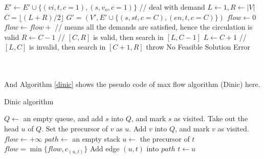 \documentclass{article}
\begin{document}
\begin{enumerate}
\begin{minipage}[H]{0.9\textwidth}
\begin{algorithm}[H]
\begin{algorithmic}[1]
            \State $E' \leftarrow E'\cup \{(vi, t, c=1), (s, v_o, c=1)\}$ // deal with demand
        \EndFor
        \State $L\leftarrow 1, R\leftarrow |V|$
            \State $C = \lfloor(L + R) / 2\rfloor$
            \State $G' = (V', E'\cup\{(s, st, c=C), (en, t, c=C)\})$
            \State$flow\leftarrow 0$
                \State $flow \leftarrow flow +$
            \EndWhile
             // means all the demands are satisfied, hence the circulation is valid
                \State $R\leftarrow C-1$ // $[C, R]$ is valid, then search in $[L, C-1]$
            \Else 
                \State $L\leftarrow C+1$ // $[L, C]$ is invalid, then search in $[C+1, R]$
            \EndIf
        \EndWhile
            \State {}
        \Else
            \State throw No Feasible Solution Error
        \EndIf
    \EndFunction
\end{algorithmic}
\end{algorithm}
\end{minipage}\\~\\
And Algorithm \ref{dinic} shows the pseudo code of max flow algorithm (Dinic) here.\\
\begin{minipage}[htb]{0.9\textwidth}
\begin{algorithm}[H]
\caption{Dinic algorithm}
\label{dinic}
\begin{algorithmic}[1]
    \State $Q\leftarrow$ an empty queue, and add $s$ into $Q$, and mark $s$ as visited.
        \State Take out the head $u$ of $Q$.
                \State Set the precursor of $v$ as $u$.
                    \State {}
                \EndIf
                \State Add $v$ into $Q$, and mark $v$ as visited.
            \EndIf
        \EndFor
    \EndWhile
    \State {}
\EndFunction
\State
{}
    \State $flow \leftarrow +\infty$
    \State $path \leftarrow $ an empty stack
        \State $u\leftarrow$ the precursor of $t$
        \State $flow = \min\{flow, c_{(u,t)}\}$
        \State Add edge $(u, t)$ into $path$
        \State $t\leftarrow u$
    \EndWhile

\end{algorithmic}
\end{algorithm}
\end{minipage}
\end{enumerate}
\end{document}
